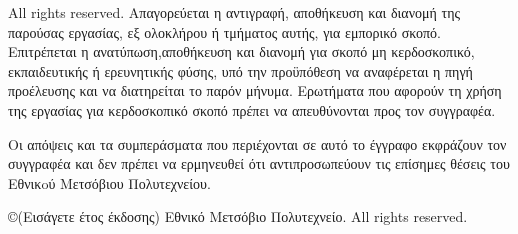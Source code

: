 \documentclass[12pt, twoside, a4paper]{report}
\begin{document}
\bigskip


\noindent
\textlatin{All rights reserved}. Απαγορεύεται η αντιγραφή, αποθήκευση και διανομή της παρούσας εργασίας, εξ ολοκλήρου ή τμήματος αυτής, για εμπορικό σκοπό. Επιτρέπεται η ανατύπωση,αποθήκευση και διανομή για σκοπό μη κερδοσκοπικό, εκπαιδευτικής ή ερευνητικής φύσης, υπό την προϋπόθεση να αναφέρεται η πηγή προέλευσης και να διατηρείται το παρόν μήνυμα. Ερωτήματα που αφορούν τη χρήση της εργασίας για κερδοσκοπικό σκοπό πρέπει να απευθύνονται προς τον συγγραφέα.\\

\bigskip

\noindent Οι απόψεις και τα συμπεράσματα που περιέχονται σε αυτό το έγγραφο εκφράζουν τον συγγραφέα και δεν πρέπει να ερμηνευθεί ότι αντιπροσωπεύουν τις επίσημες θέσεις του Εθνικoύ Μετσόβιου Πολυτεχνείου. \\
\vspace{8ex}

%
%
\newpage


\tableofcontents
\listoffigures
\lstlistoflistings

% 
% 
% 





\newpage
\small
\noindent
{}  %
\copyright \hspace{1em}(Εισάγετε έτος έκδοσης) Εθνικό Μετσόβιο Πολυτεχνείο.
\textlatin{All rights reserved.}

\newpage
{}  %
\printindex  %
\nocite{*}
\end{document}
